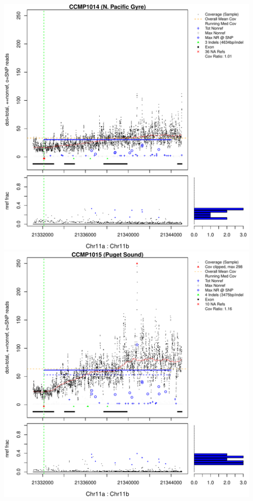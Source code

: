 \documentclass{article}\usepackage[]{graphicx}\usepackage[]{color}
\makeatletter
\def\maxwidth{ %
  \ifdim\Gin@nat@width>\linewidth
    \linewidth
  \else
    \Gin@nat@width
  \fi
}
\newenvironment{knitrout}{}{} %
\makeatother
\begin{document}
\begin{knitrout}
{\includegraphics[width=\maxwidth]{figs-knitr/unnamed-chunk-52-5} 
\includegraphics[width=\maxwidth]{figs-knitr/unnamed-chunk-52-6} 
}
\end{knitrout}
\end{document}
